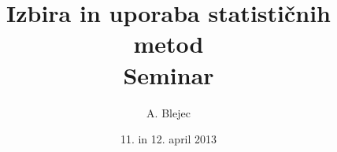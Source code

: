 \usepackage[slovene]{babel}
\usepackage[utf8]{inputenc} %
\newcommand{\SVNRevision}{$ $Rev: 3 $ $}
\newcommand{\SVNId}{$ $Id: program.Rnw 3 2009-02-22 17:36:08Z ABlejec $ $}
%
%


%
\usepackage{pgf,pgfarrows,pgfnodes,pgfautomata,pgfheaps,pgfshade}
\usepackage{amsmath,amssymb}
\usepackage{colortbl}
\usepackage{Sweave}

\newcommand{\BV}{}
\newcommand{\EV}{}
\newcommand{\myemph}[1]{{\color{Sgreen} \textit{#1}}}

%
\title{Izbira in uporaba statističnih metod\\Seminar}
\author{A. Blejec}
%

\date{11. in 12. april 2013}%

 {\maketitle}
 {\frame{\titlepage}}
\tableofcontents
\begin{abstract}
 
\end{abstract}

%
\usepackage[utf8]{inputenc} %
